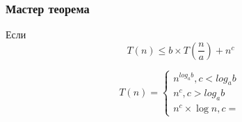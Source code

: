\hypertarget{ux43cux430ux441ux442ux435ux440-ux442ux435ux43eux440ux435ux43cux430}{%
\subsubsection{Мастер
теорема}\label{ux43cux430ux441ux442ux435ux440-ux442ux435ux43eux440ux435ux43cux430}}

Если \[
T(n) \leq b\times T \left( \frac{n}{a} \right) + n^c
\]

\[
T(n) = \begin{cases}
n^{log_a b}, c < log_a b \\
n^c, c > log_a b \\
n^c \times {\log n}, c = 
\end{cases}
\]
